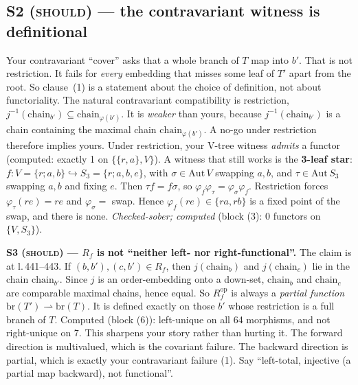 \documentclass[11pt]{article}
\newcommand{\iss}[1]{\textsc{#1}}
\newcommand{\br}{\mathrm{br}}
\begin{document}
\subsection{S2 (\iss{should}) --- the contravariant witness is definitional}
Your contravariant ``cover'' asks that a whole branch of $T$ map into $b'$. That is not
restriction. It fails for \emph{every} embedding that misses some leaf of $T'$ apart from the root.
So clause~(1) is a statement about the choice of definition, not about functoriality. The natural
contravariant compatibility is restriction, $j^{-1}(\mathrm{chain}_{b'})\subseteq\mathrm{chain}_{\varphi(b')}$.
It is \emph{weaker} than yours, because $j^{-1}(\mathrm{chain}_{b'})$ is a chain containing the
maximal chain $\mathrm{chain}_{\varphi(b')}$. A no-go under restriction therefore implies yours.
Under restriction, your V-tree witness \emph{admits} a functor (computed: exactly 1 on
$\{\{r,a\},V\}$). A witness that still works is the \textbf{3-leaf star}: $f\colon V=\{r;a,b\}
\hookrightarrow S_3=\{r;a,b,e\}$, with $\sigma\in\mathrm{Aut}\,V$ swapping $a,b$, and $\tau\in\mathrm{Aut}\,S_3$
swapping $a,b$ and fixing $e$. Then $\tau f=f\sigma$, so $\varphi_f\varphi_\tau=\varphi_\sigma\varphi_f$.
Restriction forces $\varphi_\tau(re)=re$ and $\varphi_\sigma=$ swap. Hence $\varphi_f(re)\in\{ra,rb\}$
is a fixed point of the swap, and there is none. \emph{Checked-sober; computed} (block (3): 0 functors
on $\{V,S_3\}$).

\textbf{S3 (\iss{should}) --- $R_f$ is not ``neither left- nor right-functional''.} The claim is at
l.\,441--443. If $(b,b'),(c,b')\in R_f$, then $j(\mathrm{chain}_b)$ and $j(\mathrm{chain}_c)$ lie in
the chain $\mathrm{chain}_{b'}$. Since $j$ is an order-embedding onto a down-set, $\mathrm{chain}_b$
and $\mathrm{chain}_c$ are comparable maximal chains, hence equal. So $R_f^{\mathrm{op}}$ is always a
\emph{partial function} $\br(T')\rightharpoonup\br(T)$. It is defined exactly on those $b'$ whose
restriction is a full branch of $T$. Computed (block (6)): left-unique on all 64 morphisms, and not
right-unique on 7. This sharpens your story rather than hurting it. The forward direction is
multivalued, which is the covariant failure. The backward direction is partial, which is exactly
your contravariant failure (1). Say ``left-total, injective (a partial map backward), not
functional''.
\end{document}
